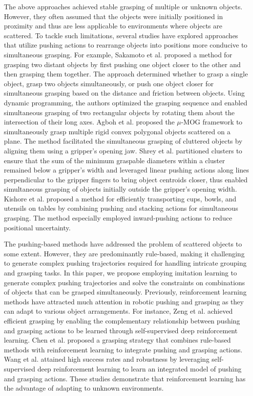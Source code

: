 The above approaches achieved stable grasping of multiple or unknown objects. However, they often assumed that the objects were initially positioned in proximity and thus are less applicable to environments where objects are scattered. To tackle such limitations, several studies have explored approaches that utilize pushing actions to rearrange objects into positions more conducive to simultaneous grasping. For example, Sakamoto et al. \cite{sakamoto2021efficient} proposed a method for grasping two distant objects by first pushing one object closer to the other and then grasping them together. The approach determined whether to grasp a single object, grasp two objects simultaneously, or push one object closer for simultaneous grasping based on the distance and friction between objects. Using dynamic programming, the authors optimized the grasping sequence and enabled simultaneous grasping of two rectangular objects by rotating them about the intersection of their long axes. Agboh et al. \cite{agboh2022multi}\cite{agboh2023learning} proposed the $\mu$-MOG framework to simultaneously grasp multiple rigid convex polygonal objects scattered on a plane. The method facilitated the simultaneous grasping of cluttered objects by aligning them using a gripper's opening jaw. Shrey et al. \cite{aeron2023push} partitioned clusters to ensure that the sum of the minimum graspable diameters within a cluster remained below a gripper’s width and leveraged linear pushing actions along lines perpendicular to the gripper fingers to bring object centroids closer, thus enabled simultaneous grasping of objects initially outside the gripper's opening width. Kishore et al. \cite{srinivas2023busboy} proposed a method for efficiently transporting cups, bowls, and utensils on tables by combining pushing and stacking actions for simultaneous grasping. The method especially employed inward-pushing actions to reduce positional uncertainty. 

The pushing-based methods have addressed the problem of scattered objects to some extent. However, they are predominantly rule-based, making it challenging to generate complex pushing trajectories required for handling intricate grouping and grasping tasks. In this paper, we propose employing imitation learning to generate complex pushing trajectories and solve the constraints on combinations of objects that can be grasped simultaneously. Previously, reinforcement learning methods have attracted much attention in robotic pushing and grasping as they can adapt to various object arrangements. For instance, Zeng et al. \cite{zeng2018learning} achieved efficient grasping by enabling the complementary relationship between pushing and grasping actions to be learned through self-supervised deep reinforcement learning. Chen et al. \cite{chen2020combining} proposed a grasping strategy that combines rule-based methods with reinforcement learning to integrate pushing and grasping actions. Wang et al. \cite{wang2024self} attained high success rates and robustness by leveraging self-supervised deep reinforcement learning to learn an integrated model of pushing and grasping actions. These studies demonstrate that reinforcement learning has the advantage of adapting to unknown environments. 

